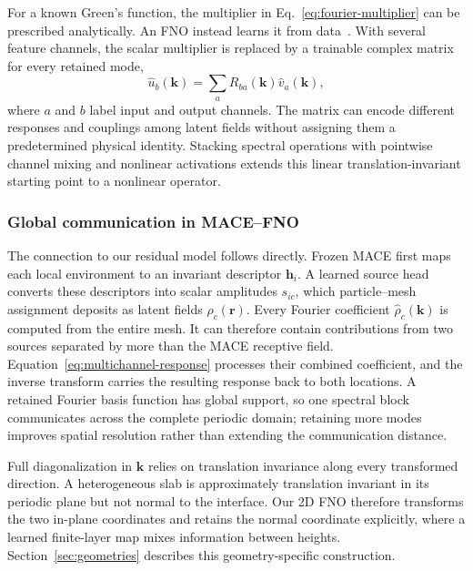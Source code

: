 \documentclass[11pt]{article}
\begin{document}
For a known Green's function, the multiplier in
Eq.~\eqref{eq:fourier-multiplier} can be prescribed analytically. An FNO
instead learns it from data~\citep{li2021fno}. With several feature channels,
the scalar multiplier is replaced by a trainable complex matrix for every
retained mode,
\begin{equation}
 \widehat u_b(\mathbf k)
 =\sum_a R_{ba}(\mathbf k)\widehat v_a(\mathbf k),
 \label{eq:multichannel-response}
\end{equation}
where \(a\) and \(b\) label input and output channels. The matrix can encode
different responses and couplings among latent fields without assigning them
a predetermined physical identity. Stacking spectral operations with
pointwise channel mixing and nonlinear activations extends this linear
translation-invariant starting point to a nonlinear operator.

\subsubsection{Global communication in MACE--FNO}

The connection to our residual model follows directly. Frozen MACE first maps
each local environment to an invariant descriptor \(\mathbf h_i\). A learned
source head converts these descriptors into scalar amplitudes
\(s_{ic}\), which particle--mesh assignment deposits as latent fields
\(\rho_c(\mathbf r)\). Every Fourier coefficient
\(\widehat\rho_c(\mathbf k)\) is computed from the entire mesh. It can
therefore contain contributions from two sources separated by more than the
MACE receptive field. Equation~\eqref{eq:multichannel-response} processes
their combined coefficient, and the inverse transform carries the resulting
response back to both locations. A retained Fourier basis function has global
support, so one spectral block communicates across the complete periodic
domain; retaining more modes improves spatial resolution rather than extending
the communication distance.

Full diagonalization in \(\mathbf k\) relies on translation invariance along
every transformed direction. A heterogeneous slab is approximately
translation invariant in its periodic plane but not normal to the interface.
Our 2D FNO therefore transforms the two in-plane coordinates and retains the
normal coordinate explicitly, where a learned finite-layer map mixes
information between heights. Section~\ref{sec:geometries} describes this
geometry-specific construction.
\end{document}

